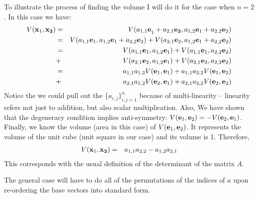 \documentclass{article}
\begin{document}
To illustrate the process of finding the volume I will do it for the case
when $n=2$.
In this case we have:
\begin{eqnarray*}
  V({\bf x}_1, {\bf x_2})
  & = & V({a_{1,1} \bf e}_1 + a_{2, 1} {\bf e_2}, a_{1, 2}{\bf e}_1 + a_{2, 2}{\bf e}_2) \\
  & = & V({a_{1,1} {\bf e}_1}, a_{1, 2}{\bf e}_1 + a_{2, 2}{\bf e}_2)
        + V({a_{2,1} {\bf e}_2}, a_{1, 2}{\bf e}_1 + a_{2, 2}{\bf e}_2) \\
  & = & V(a_{1,1} {\bf e}_1, a_{1,2}{\bf e}_1) + V(a_{1,1} {\bf e}_1, a_{2,2} {\bf e}_2) \\
  & + & V(a_{2,1} {\bf e}_2, a_{1,2}{\bf e}_1) + V(a_{2,1} {\bf e}_2, a_{2,2} {\bf e}_2) \\
  & = & a_{1,1} a_{1,2} V({\bf e}_1, {\bf e}_1) + a_{1,1}a_{2,2} V({\bf e}_1, {\bf e}_2) \\
  & + & a_{2,1} a_{1,2} V({\bf e}_2, {\bf e}_1) + a_{2,1} a_{2,2} V({\bf e}_2, {\bf e}_2)
\end{eqnarray*} 
Notice the we could pull out the $\{a_{i,j}\}_{i,j=1}^n$
because of multi-linearity -- linearity
refers not just to addition, but also scalar multiplication. 
Also, We have shown that the degeneracy condition implies anti-symmetry:
$V({\bf e}_1, {\bf e}_2) = - V({\bf e}_2, {\bf e}_1)$.
Finally, we know the volume (area in this case) of $V({\bf e}_1, {\bf e}_2)$. It
represents the volume of the unit cube (unit square in our case) and its volume is 1.
Therefore,
\begin{eqnarray}
  V({\bf x}_1, {\bf x_2}) & = & a_{1,1} a_{2,2} - a_{1,2} a_{2,1}
\end{eqnarray}
This corresponds with the usual definition of the determinant of the matrix $A$.

The general case will have to do all of the permutations of the indices of $a$
upon re-ordering the base vectors into standard form.
\end{document}
